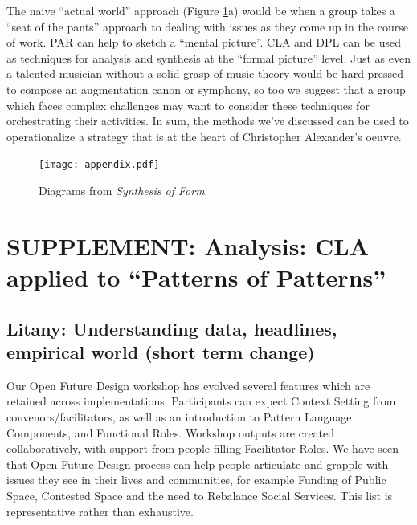 \documentclass[acmlarge,timestamp]{acmart}
\begin{document}
The naive ``actual world'' approach (Figure \ref{synthesis-diagrams}a)
would be when a group takes a ``seat of the pants'' approach to
dealing with issues as they come up in the course of work.  PAR can
help to sketch a ``mental picture''.  CLA and DPL can be used as
techniques for analysis and synthesis at the ``formal picture'' level.
 Just as even a talented
musician without a solid grasp of music theory would be hard pressed
to compose an augmentation canon or symphony, so too we suggest that a
group which faces complex challenges may want to consider these
techniques for orchestrating their activities.  In sum, the methods
we’ve discussed can be used to operationalize a strategy that is at
the heart of Christopher Alexander’s oeuvre.

\begin{figure}[h]
\texttt{[image: appendix.pdf]}
\caption{Diagrams from \emph{Synthesis of Form}\label{synthesis-diagrams}}
\end{figure}
\FloatBarrier

\section{SUPPLEMENT: Analysis: CLA applied to “Patterns of Patterns”} \label{cla-appendix}
\subsection{Litany: Understanding data, headlines, empirical world (short term change)}
Our Open Future Design workshop has evolved several features which are
retained across implementations.  Participants can expect {\sc
  Context Setting} from convenors/facilitators, as well as an
introduction to {\sc Pattern Language Components}, and {\sc Functional
  Roles}.  Workshop outputs are created collaboratively, with support
from people filling {\sc Facilitator Roles}.  We have seen that Open
Future Design process can help people articulate and grapple with
issues they see in their lives and communities, for example {\sc
  Funding of Public Space}, {\sc Contested Space} and the need to {\sc
  Rebalance Social Services}.  This list is representative rather than
exhaustive.  
\end{document}
